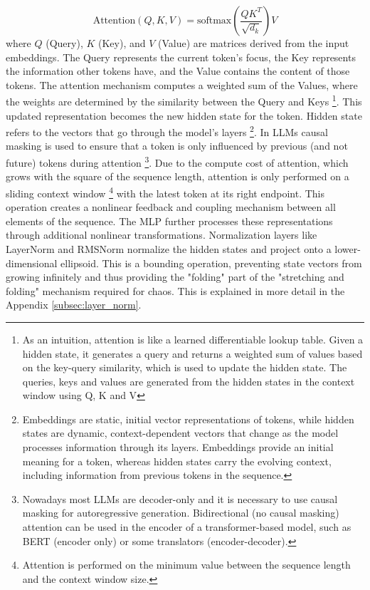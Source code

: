 \documentclass[a4paper,12pt]{article}
\begin{document}
\begin{equation}
    \text{Attention}(Q, K, V) = \text{softmax}\left(\frac{QK^T}{\sqrt{d_k}}\right)V
\end{equation}
where $Q$ (Query), $K$ (Key), and $V$ (Value) are matrices derived from the input embeddings. The Query represents the current token's focus, the Key represents the information other tokens have, and the Value contains the content of those tokens. The attention mechanism computes a weighted sum of the Values, where the weights are determined by the similarity between the Query and Keys \footnote{As an intuition, attention is like a learned differentiable lookup table. Given a hidden state, it generates a query and returns a weighted sum of values based on the key-query similarity, which is used to update the hidden state. The queries, keys and values are generated from the hidden states in the context window using Q, K and V}. This updated representation becomes the new hidden state for the token. Hidden state refers to the vectors that go through the model's layers \footnote{Embeddings are static, initial vector representations of tokens, while hidden states are dynamic, context-dependent vectors that change as the model processes information through its layers. Embeddings provide an initial meaning for a token, whereas hidden states carry the evolving context, including information from previous tokens in the sequence.}.
In LLMs causal masking is used to ensure that a token is only influenced by previous (and not future) tokens during attention 
\footnote{Nowadays most LLMs are decoder-only and it is necessary to use causal masking for autoregressive generation. Bidirectional (no causal masking) attention can be used in the encoder of a transformer-based model, such as BERT (encoder only) or some translators (encoder-decoder).}.
Due to the compute cost of attention, which grows with the square of the sequence length, attention is only performed on a sliding context window \footnote{Attention is performed on the minimum value between the sequence length and the context window size.} with the latest token at its right endpoint.
This operation creates a nonlinear feedback and coupling mechanism between all elements of the sequence. The MLP further processes these representations through additional nonlinear transformations. Normalization layers like LayerNorm and RMSNorm normalize the hidden states and project onto a lower-dimensional ellipsoid. This is a bounding operation, preventing state vectors from growing infinitely and thus providing the "folding" part of the "stretching and folding" mechanism required for chaos. This is explained in more detail in the Appendix \ref{subsec:layer_norm}. %
\end{document}
